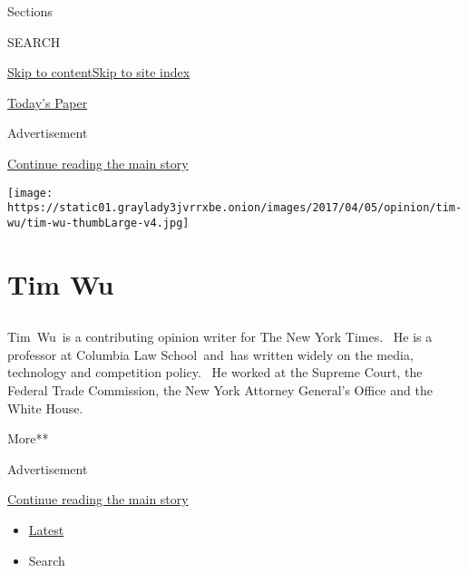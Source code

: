 Sections

SEARCH

\protect\hyperlink{site-content}{Skip to
content}\protect\hyperlink{site-index}{Skip to site index}

\href{https://myaccount.nytimes3xbfgragh.onion/auth/login?response_type=cookie\&client_id=vi}{}

\href{https://www.nytimes3xbfgragh.onion/section/todayspaper}{Today's
Paper}

Advertisement

\protect\hyperlink{after-top}{Continue reading the main story}

\texttt{[image: https://static01.graylady3jvrrxbe.onion/images/2017/04/05/opinion/tim-wu/tim-wu-thumbLarge-v4.jpg]}

\hypertarget{tim-wu}{%
\section{Tim Wu}\label{tim-wu}}

\hypertarget{section}{%
\subsection{}\label{section}}

Tim~Wu~is a contributing opinion writer for The New York Times.~ He is a
professor at Columbia Law School~and~has written widely on the media,
technology and competition policy.~ He worked at the Supreme Court, the
Federal Trade Commission, the New York Attorney General's Office and the
White House. ~~

More**

Advertisement

\protect\hyperlink{after-mid1}{Continue reading the main story}

\begin{itemize}
\tightlist
\item
  \protect\hyperlink{stream-panel}{Latest}
\item
  Search
\end{itemize}

